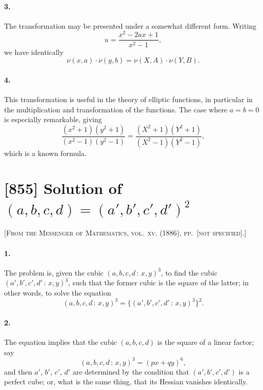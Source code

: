 \documentclass[11pt,a4paper]{article}
\theoremstyle{definition}
\begin{document}
\paragraph{3.} The transformation may be presented under a somewhat different form. Writing
\[
u = \frac{x^{2} - 2ax + 1}{x^{2} - 1},
\]
we have identically
\[
\nu(x, a) \cdot \nu(y, b) = \nu(X, A) \cdot \nu(Y, B).
\]

\paragraph{4.} This transformation is useful in the theory of elliptic functions, in particular in the multiplication and transformation of the functions. The case where $a = b = 0$ is especially remarkable, giving
\[
\frac{(x^{2}+1)(y^{2}+1)}{(x^{2}-1)(y^{2}-1)} = \frac{(X^{2}+1)(Y^{2}+1)}{(X^{2}-1)(Y^{2}-1)},
\]
which is a known formula.

\newpage
\section*{[855] Solution of $(a, b, c, d) = (a', b', c', d')^{2}$}

\noindent\textsc{[From the Messenger of Mathematics, vol.~xv. (1886), pp.~[not specified].]}

\smallskip

\paragraph{1.} The problem is, given the cubic $(a, b, c, d\,\colon\,x, y)^{3}$, to find the cubic $(a', b', c', d'\,\colon\,x, y)^{3}$, such that the former cubic is the square of the latter; in other words, to solve the equation
\[
(a, b, c, d\,\colon\,x, y)^{3} = \{(a', b', c', d'\,\colon\,x, y)^{3}\}^{2}.
\]

\paragraph{2.} The equation implies that the cubic $(a, b, c, d)$ is the square of a linear factor; say
\[
(a, b, c, d\,\colon\,x, y)^{3} = (px + qy)^{6},
\]
and then $a'$, $b'$, $c'$, $d'$ are determined by the condition that $(a', b', c', d')$ is a perfect cube; or, what is the same thing, that its Hessian vanishes identically.
\end{document}
